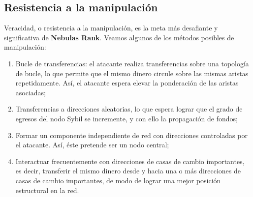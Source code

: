 \subsection{Resistencia a la manipulación}\label{subsec:robust}
Veracidad, o resistencia a la manipulación, es la meta más desafiante y significativa de \textbf{Nebulas Rank}. Veamos algunos de los métodos posibles de manipulación:
\begin{enumerate}
	\item Bucle de transferencias: el atacante realiza transferencias sobre una topología de bucle, lo que permite que el mismo dinero circule sobre las mismas aristas repetidamente. Así, el atacante espera elevar la ponderación de las aristas asociadas;
	\item Transferencias a direcciones aleatorias, lo que espera lograr que el grado de egresos del nodo Sybil se incremente, y con ello la propagación de fondos;
	\item Formar un componente independiente de red con direcciones controladas por el atacante. Así, éste pretende ser un nodo central;
	\item Interactuar frecuentemente con direcciones de casas de cambio importantes, es decir, transferir el mismo dinero desde y hacia una o más direcciones de casas de cambio importantes, de modo de lograr una mejor posición estructural en la red.
\end{enumerate}

